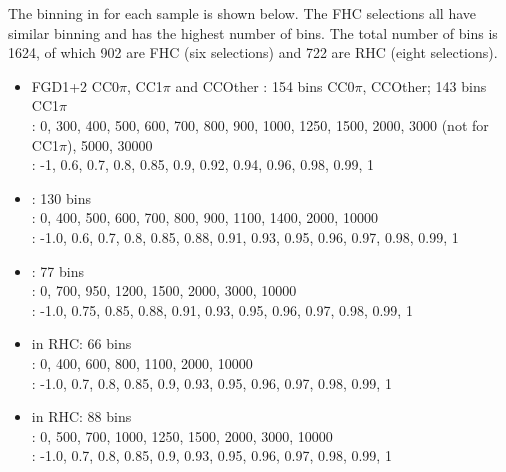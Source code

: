The binning in \pmu \cosmu for each sample is shown below. The FHC selections all have similar binning and has the highest number of bins. The total number of bins is 1624, of which 902 are FHC (six selections) and 722 are RHC (eight selections).
\begin{itemize}
	\item FGD1+2  CC$0\pi$, CC1$\pi$ and CCOther \numu: 154 bins CC0$\pi$, CCOther; 143 bins CC1$\pi$\\
	\pmu: 0, 300, 400, 500, 600, 700, 800, 900, 1000, 1250, 1500, 2000, 3000 (not for CC1$\pi$), 5000, 30000\\
	\cosmu:  -1, 0.6, 0.7, 0.8, 0.85, 0.9, 0.92, 0.94, 0.96, 0.98, 0.99, 1
	
	\item {}: 130 bins\\
	\pmu: 0, 400, 500, 600, 700, 800, 900, 1100, 1400, 2000, 10000\\
	\cosmu: -1.0, 0.6, 0.7, 0.8, 0.85, 0.88, 0.91, 0.93, 0.95, 0.96, 0.97, 0.98, 0.99, 1
	
	\item {}: 77 bins \\
	\pmu: 0, 700, 950, 1200, 1500, 2000, 3000, 10000\\
	\cosmu: -1.0, 0.75, 0.85, 0.88, 0.91, 0.93, 0.95, 0.96, 0.97, 0.98, 0.99, 1
	
	\item {} in RHC: 66 bins\\
	\pmu: 0, 400, 600, 800, 1100, 2000, 10000 \\
	\cosmu: -1.0, 0.7, 0.8, 0.85, 0.9, 0.93, 0.95, 0.96, 0.97, 0.98, 0.99, 1
	
	\item {} in RHC: 88 bins\\
	\pmu: 0, 500, 700, 1000, 1250, 1500, 2000, 3000, 10000\\
	\cosmu: -1.0, 0.7, 0.8, 0.85, 0.9, 0.93, 0.95, 0.96, 0.97, 0.98, 0.99, 1
\end{itemize}